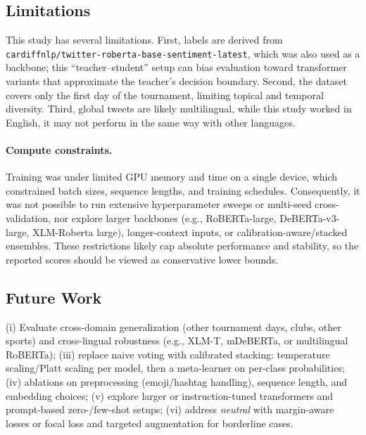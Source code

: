 \documentclass[10pt]{article}
\begin{document}
\subsection{Limitations}
This study has several limitations. First, labels are derived from \texttt{cardiffnlp/twitter-roberta-base-sentiment-latest}, which was also used as a backbone; this ``teacher--student'' setup can bias evaluation toward transformer variants that approximate the teacher's decision boundary. Second, the dataset covers only the first day of the tournament, limiting topical and temporal diversity. Third, global tweets are likely multilingual, while this study worked in English, it may not perform in the same way with other languages.

\paragraph{Compute constraints.}
Training was under limited GPU memory and time on a single device, which constrained batch sizes, sequence lengths, and training schedules. Consequently, it was not possible to run extensive hyperparameter sweeps or multi-seed cross-validation, nor explore larger backbones (e.g., RoBERTa-large, DeBERTa-v3-large, XLM-Roberta large), longer-context inputs, or calibration-aware/stacked ensembles. These restrictions likely cap absolute performance and stability, so the reported scores should be viewed as conservative lower bounds.

\subsection{Future Work}
(i) Evaluate cross-domain generalization (other tournament days, clubs, other sports) and cross-lingual robustness (e.g., XLM-T, mDeBERTa, or multilingual RoBERTa); (iii) replace naive voting with calibrated stacking: temperature scaling/Platt scaling per model, then a meta-learner on per-class probabilities; (iv) ablations on preprocessing (emoji/hashtag handling), sequence length, and embedding choices; (v) explore larger or instruction-tuned transformers and prompt-based zero-/few-shot setups; (vi) address \emph{neutral} with margin-aware losses or focal loss and targeted augmentation for borderline cases.
\end{document}
